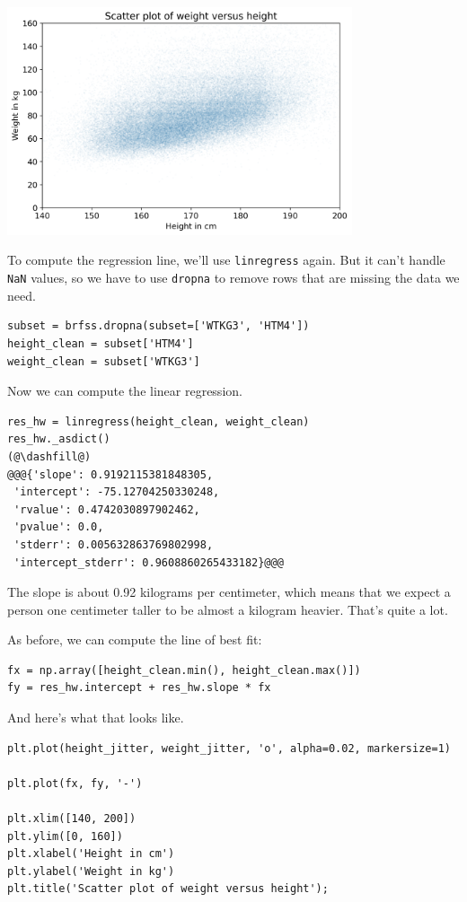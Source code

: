 \begin{center}
\includegraphics[width=4in]{chapters/09_relationships_files/09_relationships_92_0.png}
\end{center}

To compute the regression line, we'll use
\passthrough{\lstinline!linregress!} again. But it can't handle
\passthrough{\lstinline!NaN!} values, so we have to use
\passthrough{\lstinline!dropna!} to remove rows that are missing the
data we need.

\begin{lstlisting}[]
subset = brfss.dropna(subset=['WTKG3', 'HTM4'])
height_clean = subset['HTM4']
weight_clean = subset['WTKG3']
\end{lstlisting}

Now we can compute the linear regression.

\begin{lstlisting}[]
res_hw = linregress(height_clean, weight_clean)
res_hw._asdict()
(@\dashfill@)
@@@{'slope': 0.9192115381848305,
 'intercept': -75.12704250330248,
 'rvalue': 0.4742030897902462,
 'pvalue': 0.0,
 'stderr': 0.005632863769802998,
 'intercept_stderr': 0.9608860265433182}@@@
\end{lstlisting}

The slope is about 0.92 kilograms per centimeter, which means that we
expect a person one centimeter taller to be almost a kilogram heavier.
That's quite a lot.

As before, we can compute the line of best fit:

\begin{lstlisting}[]
fx = np.array([height_clean.min(), height_clean.max()])
fy = res_hw.intercept + res_hw.slope * fx
\end{lstlisting}

And here's what that looks like.

\begin{lstlisting}[]
plt.plot(height_jitter, weight_jitter, 'o', alpha=0.02, markersize=1)

plt.plot(fx, fy, '-')

plt.xlim([140, 200])
plt.ylim([0, 160])
plt.xlabel('Height in cm')
plt.ylabel('Weight in kg')
plt.title('Scatter plot of weight versus height');
\end{lstlisting}

